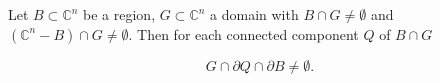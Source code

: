 Let $B \subset \mathbb{C}^n$ be a region, $G \subset \mathbb{C}^n$ a domain with $B \cap G \neq \emptyset$ and $(\mathbb{C}^n - B) \cap G \neq \emptyset$. Then for each connected component $Q$ of $B \cap G$

$$G \cap \partial Q \cap \partial B \neq \emptyset.$$
